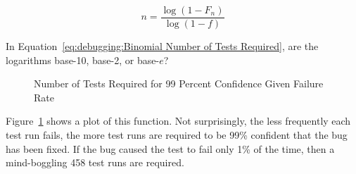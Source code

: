 \begin{equation}
	n = \frac{\log\left(1 - F_n\right)}{\log\left(1 - f\right)}
\label{eq:debugging:Binomial Number of Tests Required}
\end{equation}

\QuickQuiz{}
	In Equation~\ref{eq:debugging:Binomial Number of Tests Required},
	are the logarithms base-10, base-2, or base-$e$?
 \QuickQuizEnd

\begin{figure}[tb]
\begin{center}
\end{center}
\caption{Number of Tests Required for 99 Percent Confidence Given Failure Rate}
\label{fig:debugging:Number of Tests Required for 99 Percent Confidence Given Failure Rate}
\end{figure}

Figure~\ref{fig:debugging:Number of Tests Required for 99 Percent Confidence Given Failure Rate}
shows a plot of this function.
Not surprisingly, the less frequently each test run fails, the more
test runs are required to be 99\% confident that the bug has been
fixed.
If the bug caused the test to fail only 1\% of the time, then a
mind-boggling 458 test runs are required.

